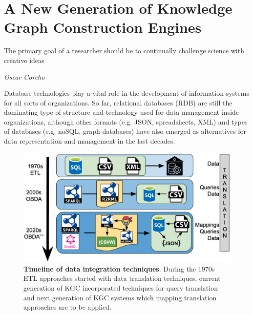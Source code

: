 
\chapter{A New Generation of Knowledge Graph Construction Engines}
\label{chapter:mappig-translation}

\epigraph{The primary goal of a researcher should be to continually challenge science with creative ideas}{\textit{Oscar Corcho}}


Database technologies play a vital role in the development of information systems for all sorts of organizations. So far, relational databases (RDB) are still the dominating type of structure and technology used for data management inside organizations, although other formats (e.g. JSON, spreadsheets, XML) and types of databases (e.g. noSQL, graph databases) have also emerged as alternatives for data representation and management in the last decades. 

\begin{figure}[!ht]
    \centering
    \includegraphics[width=1\columnwidth]{./figures/mt_obda_timeline.png}
    \caption[Timeline of data integration techniques]{\textbf{Timeline of data integration techniques}. During the 1970s ETL approaches started with data translation techniques, current generation of KGC incorporated techniques for query translation and next generation of KGC systems which mapping translation approaches are to be applied.
    }
    \label{fig:obdatimeline}
\end{figure}

